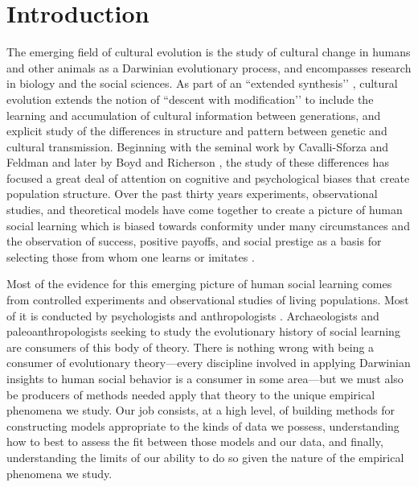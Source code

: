 
\section{Introduction}\label{ctmixtures:sec:introduction}

The emerging field of cultural evolution is the study of cultural change in humans and other animals as a Darwinian evolutionary process, and encompasses research in biology and the social sciences.  As part of an ``extended synthesis’’ \citep{Pigliucci2010}, cultural evolution extends  the notion of ``descent with modification’’ to include the learning and accumulation of cultural information between generations, and explicit study of the differences in structure and pattern between genetic and cultural transmission.  Beginning with the seminal work by Cavalli-Sforza and Feldman 
\citeyearpar{CF1981} and later by Boyd and Richerson \citeyearpar{BR1985}, the study of these differences has focused a great deal of attention on cognitive and psychological biases that create population structure.  Over the past thirty years experiments, observational studies, and theoretical models have come together to create a picture of human social learning which is biased towards conformity under many circumstances and the observation of success, positive payoffs, and social prestige as a basis for selecting those from whom one learns or imitates .  

Most of the evidence for this emerging picture of human social learning comes from controlled experiments and observational studies of living populations.  Most of it is conducted by psychologists and anthropologists \citep{whiten2016cultural,mesoudi2016evolution}.  Archaeologists and paleoanthropologists seeking to study the evolutionary history of social learning are consumers of this body of theory.  There is nothing wrong with being a consumer of evolutionary theory---every discipline involved in applying Darwinian insights to human social behavior is a consumer in some area---but we must also be producers of methods needed apply that theory to the unique empirical phenomena we study.  Our job consists, at a high level, of building methods for constructing models appropriate to the kinds of data we possess, understanding how to best to assess the fit between those models and our data, and finally, understanding the limits of our ability to do so given the nature of the empirical phenomena we study.  

